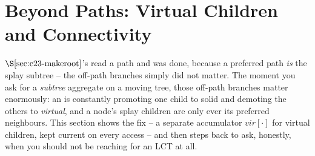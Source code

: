 \section{Beyond Paths: Virtual Children and Connectivity}\label{sec:c23-beyond}

\begin{previouslybox}
\(\secref{c23-makeroot}\)'s  read a path and was done, because a
preferred path \emph{is} the splay subtree -- the off-path branches simply did not
matter. The moment you ask for a \emph{subtree} aggregate on a moving tree, those
off-path branches matter enormously: an  is constantly promoting one
child to solid and demoting the others to \emph{virtual}, and a node's splay
children are only ever its preferred neighbours. This section shows the fix -- a
separate accumulator \(\mathit{vir}[\cdot]\) for virtual children, kept current on
every access -- and then steps back to ask, honestly, when you should not be
reaching for an LCT at all.
\end{previouslybox}

